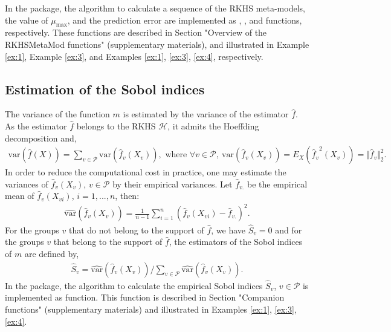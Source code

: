 In the  package, the algorithm to calculate a sequence of the RKHS meta-models, the value of $\mu_{\text{max}}$, and the prediction error are implemented as , , and  functions, respectively. These functions are described in Section "Overview of the RKHSMetaMod functions" (supplementary materials), and illustrated in Example \ref{ex:1}, Example \ref{ex:3}, and Examples \ref{ex:1}, \ref{ex:3}, \ref{ex:4}, respectively.
\subsection{Estimation of the Sobol indices}\label{subsec:SI}
The variance of the function $m$ is estimated by the variance of the estimator $\widehat{f}$. As the estimator $\widehat{f}$ belongs to the RKHS $\mathcal{H}$, it admits the Hoeffding decomposition and, 
\begin{align*}
\text{var}(\widehat{f}(X))=\sum_{v\in\mathcal{P}}\text{var}(\widehat{f}_v(X_v)),\mbox{ where }\forall v\in\mathcal{P},\: \text{var}(\widehat{f}_v(X_v))=E_X({\widehat{f}_v}^2(X_v))=\Vert \widehat{f}_v\Vert_2^2.
\end{align*}
In order to reduce the computational cost in practice, one may estimate the variances of $\widehat{f}_v(X_v)$, $v\in\mathcal{P}$ by their empirical variances. Let $\widehat{f}_{v.}$ be the empirical mean of $\widehat{f}_v(X_{vi})$, $i=1,...,n$, then: 
\begin{align*}
\widehat{\text{var}}(\widehat{f}_v(X_v))=\frac{1}{n-1}\sum_{i=1}^n(\widehat{f}_v(X_{vi})-\widehat{f}_{v.})^2.
\end{align*}
For the groups $v$ that do not belong to the support of $\widehat{f}$, we have $\widehat{S}_v=0$ and for the groups $v$ that belong to the support of $\widehat{f}$, the estimators of the Sobol indices of $m$ are defined by,
\begin{align*}
\widehat{S}_v=\widehat{\text{var}}(\widehat{f}_v(X_v))/\sum_{v\in\mathcal{P}}\widehat{\text{var}}(\widehat{f}_v(X_v)).
\end{align*}
In the  package, the algorithm to calculate the empirical Sobol indices $\widehat{S}_v$, $v\in\mathcal{P}$ is implemented as  function. This function is described in Section "Companion functions" (supplementary materials) and illustrated in Examples \ref{ex:1}, \ref{ex:3}, \ref{ex:4}.
